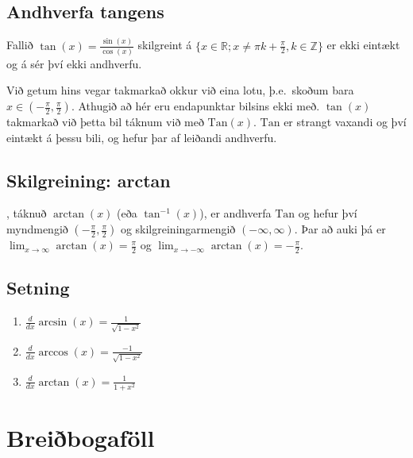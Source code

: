 \documentclass[b5paper,10pt,icelandic]{sphinxmanual}
\begin{document}
\subsection{Andhverfa tangens}
\label{\detokenize{kafli04:andhverfa-tangens}}
Fallið \(\tan(x) = \frac{\sin(x)}{\cos(x)}\) skilgreint á
\(\{x \in {{\mathbb  R}}; x \neq \pi k + \frac \pi 2, k \in {{\mathbb Z}}\}\)
er ekki eintækt og á sér því ekki andhverfu.

Við getum hins vegar takmarkað okkur við eina lotu, þ.e. skoðum bara
\(x\in (-\frac \pi 2, \frac \pi 2)\). Athugið að hér eru endapunktar
bilsins ekki með. \(\tan(x)\) takmarkað við þetta bil táknum við með
\({{\text{Tan}}}(x)\). \({{\text{Tan}}}\) er strangt vaxandi og
því eintækt á þessu bili, og hefur þar af leiðandi andhverfu.


\subsection{Skilgreining: arctan}
\label{\detokenize{kafli04:skilgreining-arctan}}
, táknuð \(\arctan(x)\) (eða
\(\tan^{-1}(x)\)), er andhverfa \({{\text{Tan}}}\) og hefur því
myndmengið \((-\frac \pi 2,
\frac \pi 2)\) og skilgreiningarmengið \((-\infty,\infty)\). Þar að
auki þá er
\(\lim_{x\to \infty} \arctan(x) = \frac \pi 2\) og
\(\lim_{x\to -\infty} \arctan(x) = -\frac \pi 2\).



\subsection{Setning}
\label{\detokenize{kafli04:id7}}\begin{enumerate}
\item {} 
\(\frac d{dx} \arcsin(x) = \frac 1{\sqrt{1-x^2}}\)

\item {} 
\(\frac d{dx} \arccos(x) = \frac {-1}{\sqrt{1-x^2}}\)

\item {} 
\(\frac d{dx} \arctan(x) = \frac 1{1+x^2}\)

\end{enumerate}


\section{Breiðbogaföll}
\label{\detokenize{kafli04:breibogafoll}}
\end{document}
